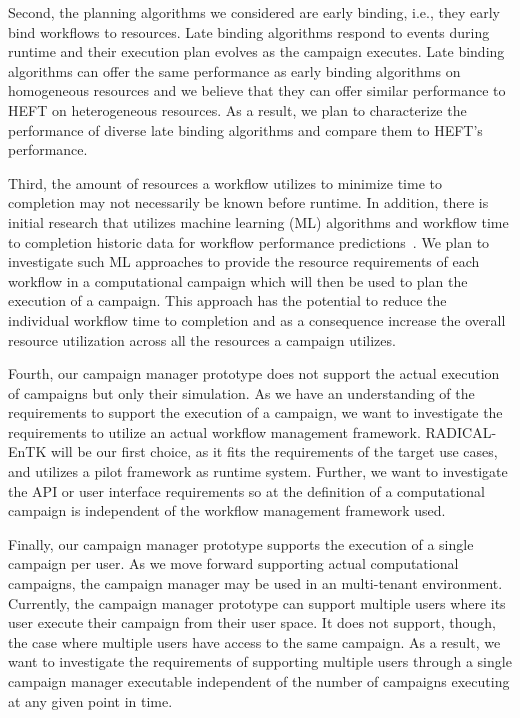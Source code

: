 Second, the planning algorithms we considered are early binding, i.e., they
early bind workflows to resources. Late binding algorithms respond to events
during runtime and their execution plan evolves as the campaign executes. Late
binding algorithms can offer the same performance as early binding algorithms on
homogeneous resources and we believe that they can offer similar performance to
HEFT on heterogeneous resources. As a result, we plan to characterize the
performance of diverse late binding algorithms and compare them to HEFT's
performance.

Third, the amount of resources a workflow utilizes to minimize time to 
completion may not necessarily be known before runtime. In addition, there is 
initial research that utilizes machine learning (ML) algorithms and workflow 
time to completion historic data for workflow performance 
predictions~\cite{singh20211modular}. We plan to investigate such ML approaches 
to provide the resource requirements of each workflow in a computational 
campaign which will then be used to plan the execution of a campaign.
This approach has the potential to reduce the individual workflow 
time to completion and as a consequence increase the overall resource 
utilization across all the resources a campaign utilizes.

Fourth, our campaign manager prototype does not support the actual execution of
campaigns but only their simulation. As we have an understanding of the
requirements to support the execution of a campaign, we want to investigate 
the requirements to utilize an actual workflow management framework.
RADICAL-EnTK will be our first choice, as it fits the requirements of the target
use cases, and utilizes a pilot framework as runtime system. Further, we want 
to investigate the API or user interface requirements so at the definition of a 
computational campaign is independent of the workflow management framework used.

Finally, our campaign manager prototype supports the execution of a single 
campaign per user. As we move forward supporting actual computational 
campaigns, the campaign manager may be used in an multi-tenant environment. 
Currently, the campaign manager prototype can support multiple users where its 
user execute their campaign from their user space. It does not support, though, 
the case where multiple users have access to the same campaign. As a result, we 
want to investigate the requirements of supporting multiple users through a 
single campaign manager executable independent of the number of campaigns 
executing at any given point in time.